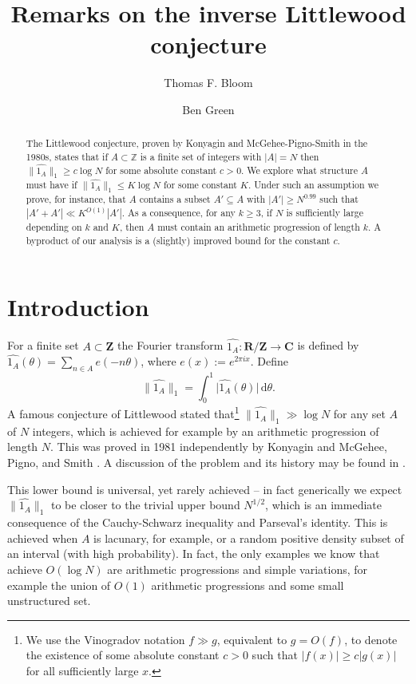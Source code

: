 \documentclass[reqno]{amsart}
\newcommand{\anorm}[1]{\| \widehat{#1}\|}
\renewcommand{\leq}{\leqslant}
\renewcommand{\geq}{\geqslant}
\newcommand{\ind}[1]{1_{#1}}
\newcommand{\bbz}{\mathbf{Z}}
\newcommand{\bbr}{\mathbf{R}}
\newcommand{\bbc}{\mathbf{C}}
\newcommand{\td}{\,\mathrm{d}}
\newcommand{\abs}[1]{\left\lvert #1\right\rvert}
\numberwithin{equation}{section}
\theoremstyle{definition}
\theoremstyle{remark}
\begin{document}
\title{Remarks on the inverse Littlewood conjecture}
\author{Thomas F. Bloom}
\address{Department of Mathematics, University of Manchester, Manchester, M13 9PL, UK}
\author{Ben Green}
\address{Mathematical Institute, Andrew Wiles Building, Radcliffe Observatory Quarter, Woodstock
Rd, Oxford OX2 6QW, UK}
\begin{abstract}
The Littlewood conjecture, proven by Konyagin and McGehee-Pigno-Smith in the 1980s, states that if $A\subset \mathbb{Z}$ is a finite set of integers with $\lvert A\rvert=N$ then $\| \widehat{1_A}\|_1\geq  c\log N$ for some absolute constant $c > 0$. We explore what structure $A$ must have if $\| \widehat{1_A}\|_1\leq K\log N$ for some constant $K$. Under such an assumption we prove, for instance, that $A$ contains a subset $A'\subseteq A$ with $\lvert A'\rvert \geq N^{0.99}$ such that $|A' + A'| \ll K^{O(1)}|A'|$. As a consequence, for any $k\geq 3$, if $N$ is sufficiently large depending on $k$ and $K$, then $A$ must contain an arithmetic progression of length $k$. A byproduct of our analysis is a (slightly) improved bound for the constant $c$.


\end{abstract}
\maketitle


\section{Introduction}
For a finite set $A\subset\bbz$ the Fourier transform $\widehat{\ind{A}}: \bbr/\bbz \to\bbc$ is defined by $\widehat{\ind{A}}(\theta)=\sum_{n\in A}e(-n\theta)$, where $e(x) :=e^{2\pi ix}$. Define
\[\|\widehat{\ind{A}}\|_1 = \int_0^1 \lvert\widehat{\ind{A}}(\theta)\rvert\td \theta.\]
A famous conjecture of Littlewood stated that\footnote{We use the Vinogradov notation $f\gg g$, equivalent to $g=O(f)$, to denote the existence of some absolute constant $c>0$ such that $\abs{f(x)}\geq c\abs{g(x)}$ for all sufficiently large $x$.} $\anorm{\ind{A}}_1 \gg \log N$ for any set $A$ of $N$ integers, which is achieved for example by an arithmetic progression of length $N$. This was proved in 1981 independently by Konyagin \cite{Ko81} and McGehee, Pigno, and Smith \cite{MPS81}. A discussion of the problem and its history may be found in \cite[Chapter 10]{Choiment-Queffelec}. 

This lower bound is universal, yet rarely achieved -- in fact generically we expect $\anorm{\ind{A}}_1$ to be closer to the trivial upper bound $N^{1/2}$, which is an immediate consequence of the Cauchy-Schwarz inequality and Parseval's identity. This is achieved when $A$ is lacunary, for example, or a random positive density subset of an interval (with high probability). In fact, the only examples we know that achieve $O(\log N)$ are arithmetic progressions and simple variations, for example the union of $O(1)$ arithmetic progressions and some small unstructured set.
\end{document}
